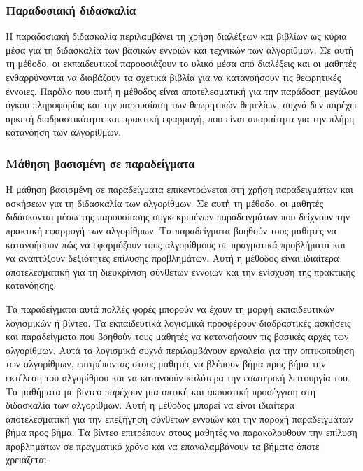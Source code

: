 \subsubsection{Παραδοσιακή διδασκαλία}

Η παραδοσιακή διδασκαλία περιλαμβάνει τη χρήση διαλέξεων και βιβλίων ως κύρια μέσα για τη διδασκαλία των βασικών εννοιών και τεχνικών των αλγορίθμων. Σε αυτή τη μέθοδο, οι εκπαιδευτικοί παρουσιάζουν το υλικό μέσα από διαλέξεις και οι μαθητές ενθαρρύνονται να διαβάζουν τα σχετικά βιβλία για να κατανοήσουν τις θεωρητικές έννοιες. Παρόλο που αυτή η μέθοδος είναι αποτελεσματική για την παράδοση μεγάλου όγκου πληροφορίας και την παρουσίαση των θεωρητικών θεμελίων, συχνά δεν παρέχει αρκετή διαδραστικότητα και πρακτική εφαρμογή, που είναι απαραίτητα για την πλήρη κατανόηση των αλγορίθμων\cite{__2017}.

\subsubsection{Μάθηση βασισμένη σε παραδείγματα}

Η μάθηση βασισμένη σε παραδείγματα επικεντρώνεται στη χρήση παραδειγμάτων και ασκήσεων για τη διδασκαλία των αλγορίθμων. Σε αυτή τη μέθοδο, οι μαθητές διδάσκονται μέσω της παρουσίασης συγκεκριμένων παραδειγμάτων που δείχνουν την πρακτική εφαρμογή των αλγορίθμων. Τα παραδείγματα βοηθούν τους μαθητές να κατανοήσουν πώς να εφαρμόζουν τους αλγορίθμους σε πραγματικά προβλήματα και να αναπτύξουν δεξιότητες επίλυσης προβλημάτων. Αυτή η μέθοδος είναι ιδιαίτερα αποτελεσματική για τη διευκρίνιση σύνθετων εννοιών και την ενίσχυση της πρακτικής κατανόησης\cite{crepinsek_note_2012}.

Τα παραδείγματα αυτά πολλές φορές μπορούν να έχουν τη μορφή εκπαιδευτικών λογισμικών ή βίντεο. Τα εκπαιδευτικά λογισμικά προσφέρουν διαδραστικές ασκήσεις και παραδείγματα που βοηθούν τους μαθητές να κατανοήσουν τις βασικές αρχές των αλγορίθμων. Αυτά τα λογισμικά συχνά περιλαμβάνουν εργαλεία για την οπτικοποίηση των αλγορίθμων, επιτρέποντας στους μαθητές να βλέπουν βήμα προς βήμα την εκτέλεση του αλγορίθμου και να κατανοούν καλύτερα την εσωτερική λειτουργία του\cite{__2017}. Τα μαθήματα με βίντεο παρέχουν μια οπτική και ακουστική προσέγγιση στη διδασκαλία των αλγορίθμων. Αυτή η μέθοδος μπορεί να είναι ιδιαίτερα αποτελεσματική για την επεξήγηση σύνθετων εννοιών και την παροχή παραδειγμάτων βήμα προς βήμα. Τα βίντεο επιτρέπουν στους μαθητές να παρακολουθούν την επίλυση προβλημάτων σε πραγματικό χρόνο και να επαναλαμβάνουν τα βήματα όποτε χρειάζεται\cite{__2022}.

